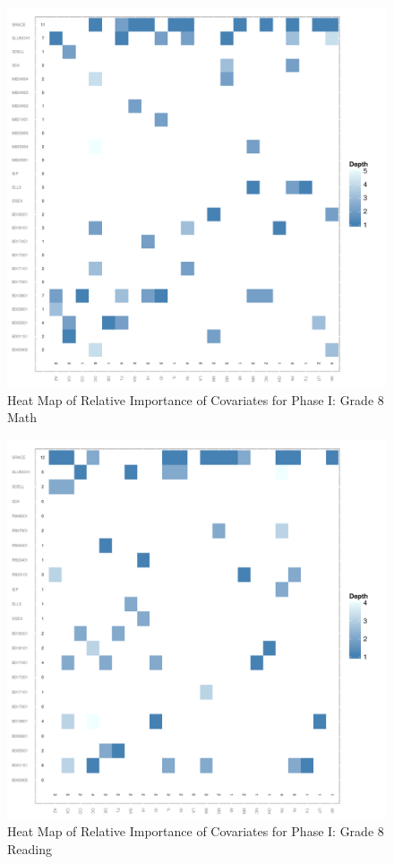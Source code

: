 \documentclass[letterpaper,12p,twoside]{article} %
\begin{document}
\begin{figure}[h]
\begin{center}
\includegraphics[width=\textwidth]{../Figures2009/g8math-mlpsa-ctree-heat.pdf}
\caption{Heat Map of Relative Importance of Covariates for Phase I: Grade 8 Math}
\label{fig:g8math-mlpsa-ctree-heat}
\end{center}
\end{figure}

\begin{figure}[h]
\begin{center}
\includegraphics[width=\textwidth]{../Figures2009/g8read-mlpsa-ctree-heat.pdf}
\caption{Heat Map of Relative Importance of Covariates for Phase I: Grade 8 Reading}
\label{fig:g8read-mlpsa-ctree-heat}
\end{center}
\end{figure}
\end{document}
